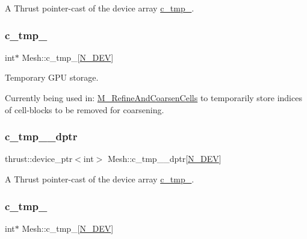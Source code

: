 A Thrust pointer-\/cast of the device array \hyperlink{classMesh_a143a21c2ce68c4b6caa2f7eabd562004}{c\+\_\+tmp\+\_}. 

\mbox{\label{classMesh_ad875e5453de00af10651239c02bfe821}} 
\subsubsection{\texorpdfstring{c\+\_\+tmp\+\_}{c\_tmp\_5}}
{\footnotesize\ttfamily int$\ast$ Mesh\+::c\+\_\+tmp\+\_\mbox{[}\hyperlink{cppspec_8h_a2b674dab7a14f1bf32b48b7fda5022dc}{N\+\_\+\+D\+EV}\mbox{]}\hspace{0.3cm}{\ttfamily [private]}}



Temporary G\+PU storage. 

Currently being used in\+: \hyperlink{classMesh_a7f1c861db5b8168cff9dabf728c0ce1a}{M\+\_\+\+Refine\+And\+Coarsen\+Cells} to temporarily store indices of cell-\/blocks to be removed for coarsening. \mbox{\label{classMesh_adff4554afd7c75a1aebe67ce95f8bad1}} 
\subsubsection{\texorpdfstring{c\+\_\+tmp\+\_\+\_\+dptr}{c\_tmp\_5\_dptr}}
{\footnotesize\ttfamily thrust\+::device\+\_\+ptr$<$int$>$ Mesh\+::c\+\_\+tmp\+\_\+\_\+dptr\mbox{[}\hyperlink{cppspec_8h_a2b674dab7a14f1bf32b48b7fda5022dc}{N\+\_\+\+D\+EV}\mbox{]}\hspace{0.3cm}{\ttfamily [private]}}



A Thrust pointer-\/cast of the device array \hyperlink{classMesh_ad875e5453de00af10651239c02bfe821}{c\+\_\+tmp\+\_}. 

\mbox{\label{classMesh_a139c783dde5036a64bd83c02b65990bd}} 
\subsubsection{\texorpdfstring{c\+\_\+tmp\+\_}{c\_tmp\_6}}
{\footnotesize\ttfamily int$\ast$ Mesh\+::c\+\_\+tmp\+\_\mbox{[}\hyperlink{cppspec_8h_a2b674dab7a14f1bf32b48b7fda5022dc}{N\+\_\+\+D\+EV}\mbox{]}\hspace{0.3cm}{\ttfamily [private]}}



